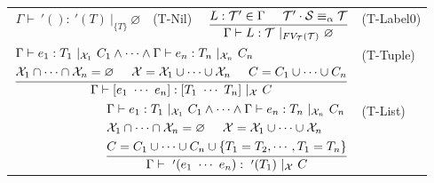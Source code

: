 \documentclass{article}
\begin{document}
\begin{figure}[tb]
    \centering
    \begin{tabular}{rlrl}
        $\Gamma \vdash\ '() :\ '(T)\ |_{\{T\}}\ \varnothing$ & (T-Nil) &
        $\dfrac{L : \mathcal{T}' \in \Gamma \hspace{5mm} \mathcal{T}' \cdot \mathcal{S} \equiv_\alpha \mathcal{T}}{\Gamma \vdash L : \mathcal{T}\ |_{FV_\mathcal{T}(\mathcal{T})}\ \varnothing}$ & (T-Label0) \vspace{5mm} \\

        \multicolumn{3}{r}{
            $\dfrac{
                \begin{aligned}
                    &\Gamma \vdash e_1 : T_1\ |_{\mathcal{X}_1}\ C_1 \land \cdots \land \Gamma \vdash e_n : T_n\ |_{\mathcal{X}_n}\ C_n \\
                    &\mathcal{X}_1 \cap \cdots \cap \mathcal{X}_n = \varnothing \hspace{5mm}
                    \mathcal{X} = \mathcal{X}_1 \cup \cdots \cup \mathcal{X}_n \hspace{5mm}
                    C = C_1 \cup \cdots \cup C_n
                \end{aligned}
            }{\Gamma \vdash [e_1\ \cdots\ e_n] : [T_1\ \cdots\ T_n]\ |_\mathcal{X}\ C}$
        } & (T-Tuple) \vspace{5mm} \\

        \multicolumn{3}{r}{
            $\dfrac{
                \begin{aligned}
                    &\Gamma \vdash e_1 : T_1\ |_{\mathcal{X}_1}\ C_1 \land \cdots \land \Gamma \vdash e_n : T_n\ |_{\mathcal{X}_n}\ C_n \\
                    &\mathcal{X}_1 \cap \cdots \cap \mathcal{X}_n = \varnothing \hspace{5mm}
                    \mathcal{X} = \mathcal{X}_1 \cup \cdots \cup \mathcal{X}_n \\
                    &C = C_1 \cup \cdots \cup C_n \cup \{T_1 = T_2, \cdots, T_1 = T_n \}
                \end{aligned}
            }{\Gamma \vdash\ '(e_1\ \cdots\ e_n) :\ '(T_1)\ |_\mathcal{X}\ C}$
        } & (T-List) \vspace{5mm} \\


\end{tabular}
\end{figure}
\end{document}
